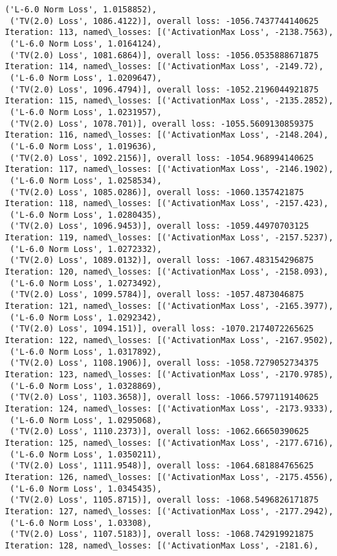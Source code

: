\documentclass[10pt]{article}
\begin{document}
\begin{Verbatim}[commandchars=\\\{\}]
 ('L-6.0 Norm Loss', 1.0158852),
 ('TV(2.0) Loss', 1086.4122)], overall loss: -1056.7437744140625
Iteration: 113, named\_losses: [('ActivationMax Loss', -2138.7563),
 ('L-6.0 Norm Loss', 1.0164124),
 ('TV(2.0) Loss', 1081.6864)], overall loss: -1056.0535888671875
Iteration: 114, named\_losses: [('ActivationMax Loss', -2149.72),
 ('L-6.0 Norm Loss', 1.0209647),
 ('TV(2.0) Loss', 1096.4794)], overall loss: -1052.2196044921875
Iteration: 115, named\_losses: [('ActivationMax Loss', -2135.2852),
 ('L-6.0 Norm Loss', 1.0231957),
 ('TV(2.0) Loss', 1078.701)], overall loss: -1055.5609130859375
Iteration: 116, named\_losses: [('ActivationMax Loss', -2148.204),
 ('L-6.0 Norm Loss', 1.019636),
 ('TV(2.0) Loss', 1092.2156)], overall loss: -1054.968994140625
Iteration: 117, named\_losses: [('ActivationMax Loss', -2146.1902),
 ('L-6.0 Norm Loss', 1.0258534),
 ('TV(2.0) Loss', 1085.0286)], overall loss: -1060.1357421875
Iteration: 118, named\_losses: [('ActivationMax Loss', -2157.423),
 ('L-6.0 Norm Loss', 1.0280435),
 ('TV(2.0) Loss', 1096.9453)], overall loss: -1059.44970703125
Iteration: 119, named\_losses: [('ActivationMax Loss', -2157.5237),
 ('L-6.0 Norm Loss', 1.0272332),
 ('TV(2.0) Loss', 1089.0132)], overall loss: -1067.483154296875
Iteration: 120, named\_losses: [('ActivationMax Loss', -2158.093),
 ('L-6.0 Norm Loss', 1.0273492),
 ('TV(2.0) Loss', 1099.5784)], overall loss: -1057.4873046875
Iteration: 121, named\_losses: [('ActivationMax Loss', -2165.3977),
 ('L-6.0 Norm Loss', 1.0292342),
 ('TV(2.0) Loss', 1094.151)], overall loss: -1070.2174072265625
Iteration: 122, named\_losses: [('ActivationMax Loss', -2167.9502),
 ('L-6.0 Norm Loss', 1.0317892),
 ('TV(2.0) Loss', 1108.1906)], overall loss: -1058.7279052734375
Iteration: 123, named\_losses: [('ActivationMax Loss', -2170.9785),
 ('L-6.0 Norm Loss', 1.0328869),
 ('TV(2.0) Loss', 1103.3658)], overall loss: -1066.5797119140625
Iteration: 124, named\_losses: [('ActivationMax Loss', -2173.9333),
 ('L-6.0 Norm Loss', 1.0295068),
 ('TV(2.0) Loss', 1110.2373)], overall loss: -1062.66650390625
Iteration: 125, named\_losses: [('ActivationMax Loss', -2177.6716),
 ('L-6.0 Norm Loss', 1.0350211),
 ('TV(2.0) Loss', 1111.9548)], overall loss: -1064.681884765625
Iteration: 126, named\_losses: [('ActivationMax Loss', -2175.4556),
 ('L-6.0 Norm Loss', 1.0345435),
 ('TV(2.0) Loss', 1105.8715)], overall loss: -1068.5496826171875
Iteration: 127, named\_losses: [('ActivationMax Loss', -2177.2942),
 ('L-6.0 Norm Loss', 1.03308),
 ('TV(2.0) Loss', 1107.5183)], overall loss: -1068.742919921875
Iteration: 128, named\_losses: [('ActivationMax Loss', -2181.6),

\end{Verbatim}
\end{document}
